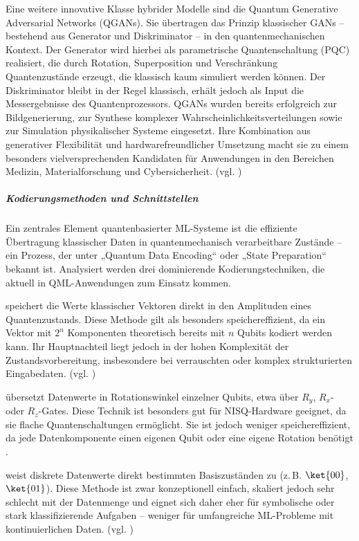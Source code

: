 Eine weitere innovative Klasse hybrider Modelle sind die Quantum Generative Adversarial Networks (QGANs). Sie übertragen das Prinzip klassischer GANs – bestehend aus Generator und Diskriminator – in den quantenmechanischen Kontext. Der Generator wird hierbei als parametrische Quantenschaltung (PQC) realisiert, die durch Rotation, Superposition und Verschränkung Quantenzustände erzeugt, die klassisch kaum simuliert werden können. Der Diskriminator bleibt in der Regel klassisch, erhält jedoch als Input die Messergebnisse des Quantenprozessors. QGANs wurden bereits erfolgreich zur Bildgenerierung, zur Synthese komplexer Wahrscheinlichkeitsverteilungen sowie zur Simulation physikalischer Systeme eingesetzt. Ihre Kombination aus generativer Flexibilität und hardwarefreundlicher Umsetzung macht sie zu einem besonders vielversprechenden Kandidaten für Anwendungen in den Bereichen Medizin, Materialforschung und Cybersicherheit. (vgl. \cite{peral-garciaSystematicLiteratureReview2024})



\subparagraph{Kodierungsmethoden und Schnittstellen}
Ein zentrales Element quantenbasierter ML-Systeme ist die effiziente Übertragung klassischer Daten in quantenmechanisch verarbeitbare Zustände – ein Prozess, der unter „Quantum Data Encoding“ oder „State Preparation“ bekannt ist. Analysiert werden drei dominierende Kodierungstechniken, die aktuell in QML-Anwendungen zum Einsatz kommen.

\item[\textbf{Amplitude Encoding}]
speichert die Werte klassischer Vektoren direkt in den Amplituden eines Quantenzustands. 
Diese Methode gilt als besonders speichereffizient, da ein Vektor mit \(2^n\) Komponenten theoretisch bereits mit \(n\) Qubits kodiert werden kann. 
Ihr Hauptnachteil liegt jedoch in der hohen Komplexität der Zustandsvorbereitung, insbesondere bei verrauschten oder komplex strukturierten Eingabedaten. (vgl. \cite{schuld_supervised_2018})
\\
\item[\textbf{Angle Encoding (auch Phase Encoding)}]übersetzt Datenwerte in Rotationswinkel einzelner Qubits, etwa über $R_y$, $R_x$- oder $R_z$-Gates. Diese Technik ist besonders gut für NISQ-Hardware geeignet, da sie flache Quantenschaltungen ermöglicht. Sie ist jedoch weniger speichereffizient, da jede Datenkomponente einen eigenen Qubit oder eine eigene Rotation benötigt \cite{schuld_supervised_2018}.
\\
\item[\textbf{Basis Encoding}] weist diskrete Datenwerte direkt bestimmten Basiszuständen zu (z.\,B. $\ket{00}$, $\ket{01}$). Diese Methode ist zwar konzeptionell einfach, skaliert jedoch sehr schlecht mit der Datenmenge und eignet sich daher eher für symbolische oder stark klassifizierende Aufgaben – weniger für umfangreiche ML-Probleme mit kontinuierlichen Daten. (vgl. \cite{schuld_supervised_2018})

